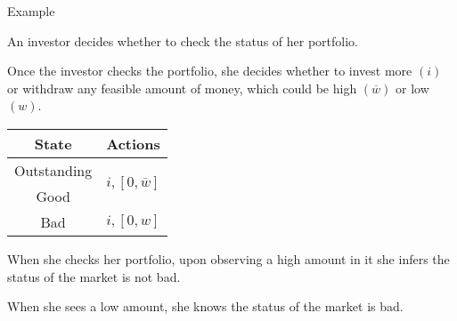 \documentclass[usenames,dvipsnames,aspectratio=169,11pt, envcountsect, handout]{beamer}
\begin{document}
\begin{frame}{Example}

	An investor decides whether to check the status of her portfolio.

	\vfill

	Once the investor checks the portfolio, she decides whether to invest more \( \left( i \right) \) or withdraw any feasible amount of money, which could be high \( \left( \overline{w} \right) \) or low \( \left( w \right) \).

	\vfill

	\begin{table}[H]
		\centering
		\begin{minipage}{0.29\textwidth}

		\end{minipage}\hspace{0.3cm} %
		\begin{minipage}{0.29\textwidth}
			\centering
			\begin{tabular}{c | c}
				State                             & Actions                                                                        \\
				\hline
				{\color{bleudefrance}Outstanding} & \multirow{2}{*}{{\color{bleudefrance}\( i, \left[ 0, \overline{w} \right] \)}} \\
				{\color{bleudefrance}Good}        &                                                                                \\
				Bad                               & \(  i, \left[0, w \right] \)                                                   \\
			\end{tabular}
			\vspace{0.5cm} %
		\end{minipage}\hspace{0.3cm} %
		\begin{minipage}{0.29\textwidth}

		\end{minipage}
	\end{table}

	\vfill

	When she checks her portfolio, upon observing a high amount in it she infers the status of the market is not bad.

	\vfill

	When she sees a low amount, she knows the status of the market is bad.

\end{frame}
\end{document}
